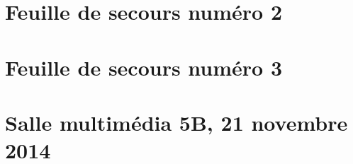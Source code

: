 \section{Feuille de secours numéro 2}



\section{Feuille de secours numéro 3}


\section{Salle multimédia 5B, 21 novembre 2014}

